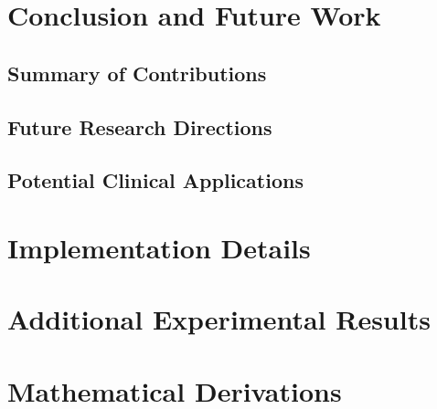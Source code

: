 \documentclass[12pt,a4paper]{report}
\begin{document}
\chapter{Conclusion and Future Work}
\section{Summary of Contributions}
\section{Future Research Directions}
\section{Potential Clinical Applications}




\appendix
\chapter{Implementation Details}
\chapter{Additional Experimental Results}
\chapter{Mathematical Derivations}
\end{document}
